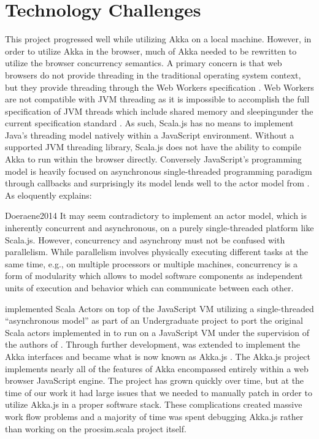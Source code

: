 \section{Technology Challenges}
\label{sec:procsim-scala:technology-challenges}

This project progressed well while utilizing Akka on a local machine. However, in order to utilize Akka in the browser, much of Akka needed to be rewritten to utilize the browser concurrency semantics. A primary concern is that web browsers do not provide threading in the traditional operating system context, but they provide threading through the Web Workers specification \cite{MDN:WebWorkers}. Web Workers are not compatible with JVM threading as it is impossible to accomplish the full specification of JVM threads which include shared memory and sleepingunder the current specification standard \cite{MDN:WebWorkers, Doeraene2017}. As such, Scala.js has no means to implement Java's threading model natively within a JavaScript environment. Without a supported JVM threading library, Scala.js does not have the ability to compile Akka to run within the browser directly. Conversely JavaScript's programming model is heavily focused on asynchronous single-threaded programming paradigm through callbacks and surprisingly its model lends well to the actor model from \cite{Agha1985}. As \cite{Doeraene2014} eloquently explains:
\begin{displaycquote}{Doeraene2014}
    It may seem contradictory to implement an actor model, which is inherently concurrent and asynchronous,
    on a purely single-threaded platform like Scala.js. However, concurrency and asynchrony must not be confused with parallelism. While parallelism involves physically executing different tasks at the same time, e.g., on multiple processors or multiple machines, concurrency is a form of modularity which allows to model software components as independent units of execution and behavior which can communicate between each other.
\end{displaycquote}
\cite{Doeraene2014} implemented Scala Actors on top of the JavaScript VM utilizing a single-threaded ``asynchronous model'' as part of an Undergraduate project to port the original Scala actors implemented in \cite{Haller2009} to run on a JavaScript VM under the supervision of the authors of \cite{Haller2009}. Through further development, \cite{Doeraene2014} was extended to implement the Akka interfaces and became what is now known as Akka.js \cite{Stivan2015, akka-js2015}. The Akka.js project implements nearly all of the features of Akka encompassed entirely within a web browser JavaScript engine. The project has grown quickly over time, but at the time of our work it had large issues that we needed to manually patch in order to utilize Akka.js in a proper software stack. These complications created massive work flow problems and a majority of time was spent debugging Akka.js rather than working on the procsim.scala project itself.


